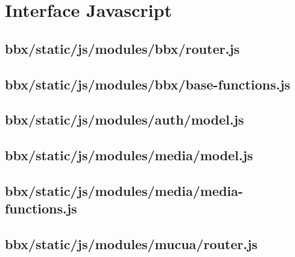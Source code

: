 %

\section{Interface Javascript}
\subsection{bbx/static/js/modules/bbx/router.js}


\subsection{bbx/static/js/modules/bbx/base-functions.js}


\subsection{bbx/static/js/modules/auth/model.js}


\subsection{bbx/static/js/modules/media/model.js}


\subsection{bbx/static/js/modules/media/media-functions.js}


\subsection{bbx/static/js/modules/mucua/router.js}



